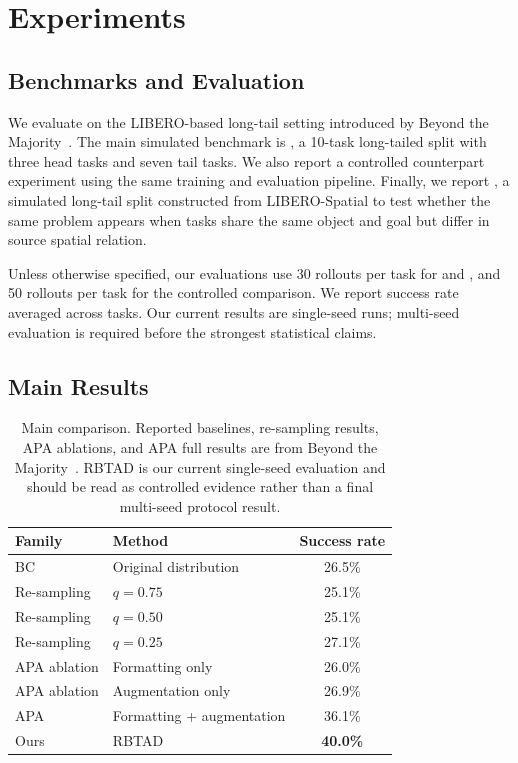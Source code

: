 \section{Experiments}
\label{sec:experiments}

\subsection{Benchmarks and Evaluation}

We evaluate on the LIBERO-based long-tail setting introduced by Beyond the Majority~\cite{zhu2026beyond}. The main simulated benchmark is \liberocorelt{}, a 10-task long-tailed split with three head tasks and seven tail tasks. We also report a controlled \liberocorefull{} counterpart experiment using the same training and evaluation pipeline. Finally, we report \liberospatiallt{}, a simulated long-tail split constructed from LIBERO-Spatial to test whether the same problem appears when tasks share the same object and goal but differ in source spatial relation.

Unless otherwise specified, our evaluations use 30 rollouts per task for \liberocorelt{} and \liberospatiallt{}, and 50 rollouts per task for the \liberocorefull{} controlled comparison. We report success rate averaged across tasks. Our current results are single-seed runs; multi-seed evaluation is required before the strongest statistical claims.

\subsection{Main Results}

\begin{table}[t]
  \centering
  \caption{Main \liberocorelt{} comparison. Reported baselines, re-sampling results, APA ablations, and APA full results are from Beyond the Majority~\cite{zhu2026beyond}. RBTAD is our current single-seed evaluation and should be read as controlled evidence rather than a final multi-seed protocol result.}
  \label{tab:main}
  \begin{tabular}{llc}
    \toprule
    Family & Method & Success rate \\
    \midrule
    BC & Original distribution & 26.5\% \\
    Re-sampling & $q=0.75$ & 25.1\% \\
    Re-sampling & $q=0.50$ & 25.1\% \\
    Re-sampling & $q=0.25$ & 27.1\% \\
    APA ablation & Formatting only & 26.0\% \\
    APA ablation & Augmentation only & 26.9\% \\
    APA & Formatting + augmentation & 36.1\% \\
    Ours & RBTAD & \textbf{40.0\%} \\
    \bottomrule
  \end{tabular}
\end{table}

